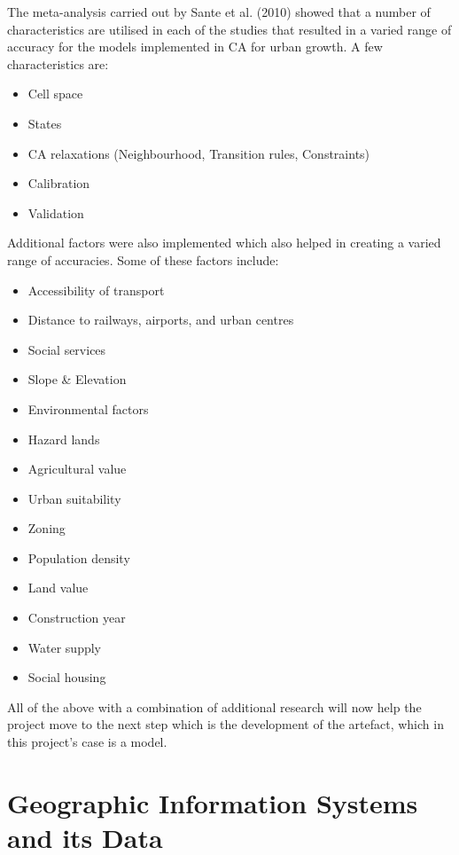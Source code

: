 The meta-analysis carried out by Sante et al. (2010) showed that a number of characteristics are utilised in each of the studies that resulted in a varied range of accuracy for the models implemented in CA for urban growth.\citep{ca1}
A few characteristics are:
\begin{itemize}
\item Cell space
\item States
\item CA relaxations (Neighbourhood, Transition rules, Constraints)
\item Calibration
\item Validation
\end{itemize}
Additional factors were also implemented which also helped in creating a
varied range of accuracies. Some of these factors include:
\begin{itemize}
\item Accessibility of transport
\item Distance to railways, airports, and urban centres
\item Social services
\item Slope \& Elevation
\item Environmental factors
\item Hazard lands
\item Agricultural value
\item Urban suitability
\item Zoning
\item Population density
\item Land value
\item Construction year
\item Water supply
\item Social housing
\end{itemize}
All of the above with a combination of additional research will now help the
project move to the next step which is the development of the artefact, which
in this project's case is a model.
\section{Geographic Information Systems and its Data}

